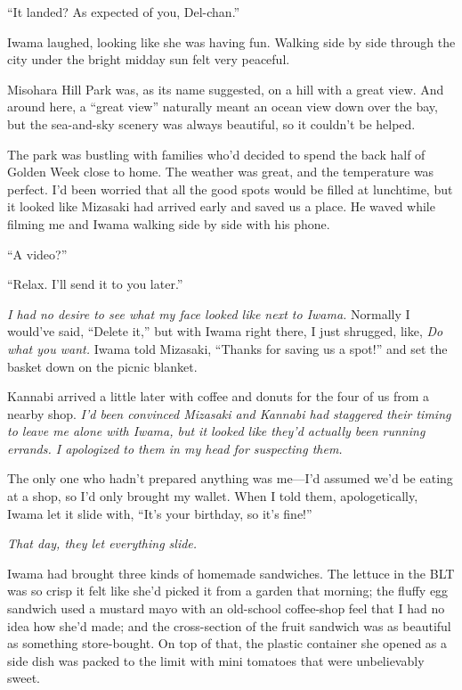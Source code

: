 \documentclass[
    a4paper,
    12pt,
    twoside,
    openany,
    UTF8,
    fontset=windows
]{ctexbook}
\begin{document}
``It landed? As expected of you, Del-chan.''

Iwama laughed, looking like she was having fun. Walking side by side through the city under the bright midday sun felt very peaceful.

Misohara Hill Park was, as its name suggested, on a hill with a great view. And around here, a ``great view'' naturally meant an ocean view down over the bay, but the sea-and-sky scenery was always beautiful, so it couldn't be helped.

The park was bustling with families who'd decided to spend the back half of Golden Week close to home. The weather was great, and the temperature was perfect. I'd been worried that all the good spots would be filled at lunchtime, but it looked like Mizasaki had arrived early and saved us a place. He waved while filming me and Iwama walking side by side with his phone.

``A video?''

``Relax. I'll send it to you later.''

\textit{I had no desire to see what my face looked like next to Iwama.} Normally I would've said, ``Delete it,'' but with Iwama right there, I just shrugged, like, \textit{Do what you want.} Iwama told Mizasaki, ``Thanks for saving us a spot!'' and set the basket down on the picnic blanket.

Kannabi arrived a little later with coffee and donuts for the four of us from a nearby shop. \textit{I'd been convinced Mizasaki and Kannabi had staggered their timing to leave me alone with Iwama, but it looked like they'd actually been running errands. I apologized to them in my head for suspecting them.}

The only one who hadn't prepared anything was me---I'd assumed we'd be eating at a shop, so I'd only brought my wallet. When I told them, apologetically, Iwama let it slide with, ``It's your birthday, so it's fine!''

\textit{That day, they let everything slide.}

Iwama had brought three kinds of homemade sandwiches. The lettuce in the BLT was so crisp it felt like she'd picked it from a garden that morning; the fluffy egg sandwich used a mustard mayo with an old-school coffee-shop feel that I had no idea how she'd made; and the cross-section of the fruit sandwich was as beautiful as something store-bought. On top of that, the plastic container she opened as a side dish was packed to the limit with mini tomatoes that were unbelievably sweet.
\end{document}
